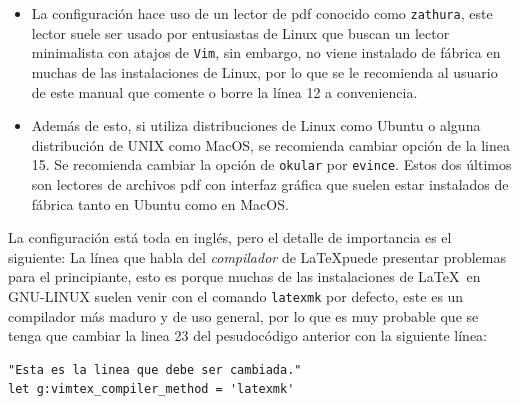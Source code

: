 \documentclass[10pt]{article}
\begin{document}
\begin{itemize}
	\item La configuración hace uso de un lector de pdf conocido como \texttt{zathura}, este lector suele ser usado por entusiastas de Linux que buscan un lector minimalista con atajos de \texttt{Vim}, sin embargo, no viene instalado de fábrica en muchas de las instalaciones de Linux, por lo que se le recomienda al usuario de este manual que comente o borre la línea 12 a conveniencia. 
	\item Además de esto, si utiliza distribuciones de Linux como Ubuntu o alguna distribución de UNIX como MacOS, se recomienda cambiar opción de la linea 15. Se recomienda cambiar la opción de \texttt{okular} por \texttt{evince}. Estos dos últimos son lectores de archivos pdf con interfaz gráfica que suelen estar instalados de fábrica tanto en Ubuntu como en MacOS. 
\end{itemize}

La configuración está toda en inglés, pero el detalle de importancia es el siguiente: La línea que habla del \textit{compilador} de \LaTeX puede presentar problemas para el principiante, esto es porque muchas de las instalaciones de \LaTeX \ en GNU-LINUX suelen venir con el comando \texttt{latexmk} por defecto, este es un compilador más maduro y de uso general, por lo que es muy probable que se tenga que cambiar la linea 23 del pesudocódigo anterior con la siguiente línea:
\begin{verbatim}
"Esta es la linea que debe ser cambiada."
let g:vimtex_compiler_method = 'latexmk'
\end{verbatim}
\end{document}
